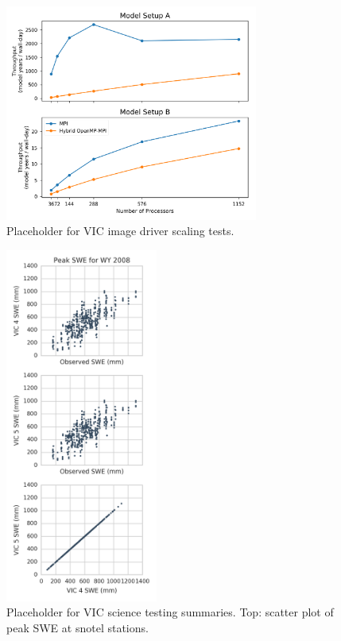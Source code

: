 \documentclass[gmd, manuscript]{copernicus}
\begin{document}
\clearpage
\begin{figure}[t]
\includegraphics[width=8.3cm]{VIC_scaling.png}
\caption{Placeholder for VIC image driver scaling tests.}
\label{fig:vic_scaling}
\end{figure}

\clearpage
\begin{figure}[t]
\includegraphics[width=5cm]{VIC_science_tests_SWE.png}
\caption{Placeholder for VIC science testing summaries. Top: scatter plot of peak SWE at snotel stations.}
\label{fig:vic_4v5}
\end{figure}
\end{document}
